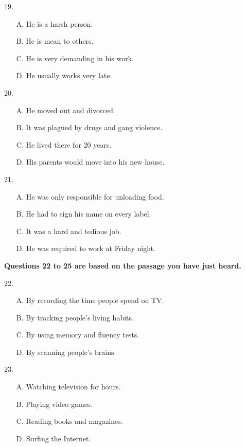\documentclass[UTF8,11pt]{ctexart}
\begin{document}
19.


\begin{itemize}[leftmargin=2em,itemsep=.2em,topsep=.4em]\item[A.] He is a harsh person.
\item[B.] He is mean to others.
\item[C.] He is very demanding in his work.
\item[D.] He usually works very late.
\end{itemize}

20.


\begin{itemize}[leftmargin=2em,itemsep=.2em,topsep=.4em]\item[A.] He moved out and divorced.
\item[B.] It was plagued by drugs and gang violence.
\item[C.] He lived there for 20 years.
\item[D.] His parents would move into his new house.
\end{itemize}

21.


\begin{itemize}[leftmargin=2em,itemsep=.2em,topsep=.4em]\item[A.] He was only responsible for unloading food.
\item[B.] He had to sign his name on every label.
\item[C.] It was a hard and tedious job.
\item[D.] He was required to work at Friday night.
\end{itemize}

\textbf{Questions 22 to 25 are based on the passage you have just heard.}


22.


\begin{itemize}[leftmargin=2em,itemsep=.2em,topsep=.4em]\item[A.] By recording the time people spend on TV.
\item[B.] By tracking people's living habits.
\item[C.] By using memory and fluency tests.
\item[D.] By scanning people's brains.
\end{itemize}

23.


\begin{itemize}[leftmargin=2em,itemsep=.2em,topsep=.4em]\item[A.] Watching television for hours.
\item[B.] Playing video games.
\item[C.] Reading books and magazines.
\item[D.] Surfing the Internet.
\end{itemize}
\end{document}
